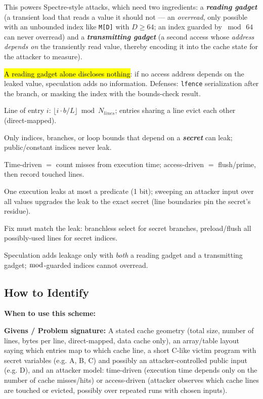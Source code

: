 \documentclass[12pt, a4paper]{article}
\newcommand{\term}[1]{\textbf{\textit{#1}}}        %
\newcommand{\imp}[1]{\hl{#1}}                       %
\begin{document}
This powers Spectre-style attacks, which need two ingredients: a \term{reading gadget} (a transient load that reads a value it should not --- an \emph{overread}, only possible with an unbounded index like \texttt{M[D]} with $D \geq 64$; an index guarded by $\bmod\, 64$ can never overread) and a \term{transmitting gadget} (a second access whose \emph{address depends on} the transiently read value, thereby encoding it into the cache state for the attacker to measure).

\imp{A reading gadget alone discloses nothing}: if no access address depends on the leaked value, speculation adds no information. Defenses: \texttt{lfence} serialization after the branch, or masking the index with the bounds-check result.

\begin{theorybox}
\begin{tightitem}
    \item Line of entry $i$: $\lfloor i \cdot b / L \rfloor \bmod N_{lines}$; entries sharing a line evict each other (direct-mapped).
    \item Only indices, branches, or loop bounds that depend on a \term{secret} can leak; public/constant indices never leak.
    \item Time-driven $=$ count misses from execution time; access-driven $=$ flush/prime, then record touched lines.
    \item One execution leaks at most a predicate (1 bit); sweeping an attacker input over all values upgrades the leak to the exact secret (line boundaries pin the secret's residue).
    \item Fix must match the leak: branchless select for secret branches, preload/flush all possibly-used lines for secret indices.
    \item Speculation adds leakage only with \emph{both} a reading gadget and a transmitting gadget; $\bmod$-guarded indices cannot overread.
\end{tightitem}
\end{theorybox}

\subsection*{How to Identify}

\textbf{When to use this scheme:}

\textbf{Givens / Problem signature:}
A stated cache geometry (total size, number of lines, bytes per line, direct-mapped, data cache only), an array/table layout saying which entries map to which cache line, a short C-like victim program with secret variables (e.g. A, B, C) and possibly an attacker-controlled public input (e.g. D), and an attacker model: time-driven (execution time depends only on the number of cache misses/hits) or access-driven (attacker observes which cache lines are touched or evicted, possibly over repeated runs with chosen inputs).
\end{document}

